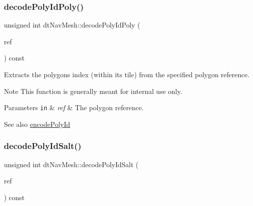 \subsubsection{\texorpdfstring{decode\+Poly\+Id\+Poly()}{decodePolyIdPoly()}\hspace{0.1cm}{\footnotesize\ttfamily [2/2]}}
{\footnotesize\ttfamily unsigned int dt\+Nav\+Mesh\+::decode\+Poly\+Id\+Poly (\begin{DoxyParamCaption}\item[{\hyperlink{group__detour_gab4e0b2257a670c1a800057999612b466}{dt\+Poly\+Ref}}]{ref }\end{DoxyParamCaption}) const\hspace{0.3cm}{\ttfamily [inline]}}

Extracts the polygon\textquotesingle{}s index (within its tile) from the specified polygon reference. \begin{DoxyNote}{Note}
This function is generally meant for internal use only. 
\end{DoxyNote}

\begin{DoxyParams}[1]{Parameters}
\mbox{\tt in}  & {\em ref} & The polygon reference. \\
\hline
\end{DoxyParams}
\begin{DoxySeeAlso}{See also}
\hyperlink{classdtNavMesh_a168a479840e7e32613f4b68ee4662d78}{encode\+Poly\+Id} 
\end{DoxySeeAlso}
\mbox{\label{classdtNavMesh_a588b6f839fd249430cff02cea71f347c}} 
\subsubsection{\texorpdfstring{decode\+Poly\+Id\+Salt()}{decodePolyIdSalt()}\hspace{0.1cm}{\footnotesize\ttfamily [1/2]}}
{\footnotesize\ttfamily unsigned int dt\+Nav\+Mesh\+::decode\+Poly\+Id\+Salt (\begin{DoxyParamCaption}\item[{\hyperlink{group__detour_gab4e0b2257a670c1a800057999612b466}{dt\+Poly\+Ref}}]{ref }\end{DoxyParamCaption}) const\hspace{0.3cm}{\ttfamily [inline]}}

